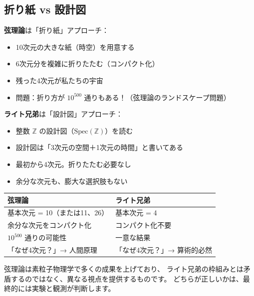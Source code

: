 \documentclass[12pt,a4paper]{article}
\begin{document}
\subsection{折り紙 vs 設計図}

\begin{analogy}
\textbf{弦理論}は「折り紙」アプローチ：
\begin{itemize}
  \item 10次元の大きな紙（時空）を用意する
  \item 6次元分を複雑に折りたたむ（コンパクト化）
  \item 残った4次元が私たちの宇宙
  \item 問題：折り方が $10^{500}$ 通りもある！（弦理論のランドスケープ問題）
\end{itemize}

\textbf{ライト兄弟}は「設計図」アプローチ：
\begin{itemize}
  \item 整数 $\mathbb{Z}$ の設計図（$\mathrm{Spec}(\mathbb{Z})$）を読む
  \item 設計図は「3次元の空間＋1次元の時間」と書いてある
  \item 最初から4次元。折りたたむ必要なし
  \item 余分な次元も、膨大な選択肢もない
\end{itemize}
\end{analogy}

\begin{center}
\renewcommand{\arraystretch}{1.3}
\begin{tabular}{p{5.5cm}p{5.5cm}}
\toprule
\textbf{弦理論} & \textbf{ライト兄弟} \\
\midrule
基本次元 = 10（または11、26） & 基本次元 = 4 \\
余分な次元をコンパクト化 & コンパクト化不要 \\
$10^{500}$ 通りの可能性 & 一意な結果 \\
「なぜ4次元？」→ 人間原理 & 「なぜ4次元？」→ 算術的必然 \\
\bottomrule
\end{tabular}
\end{center}

\begin{funfact}[公平な注意]
弦理論は素粒子物理学で多くの成果を上げており、
ライト兄弟の枠組みとは矛盾するのではなく、異なる視点を提供するものです。
どちらが正しいかは、最終的には実験と観測が判断します。
\end{funfact}

\end{document}
